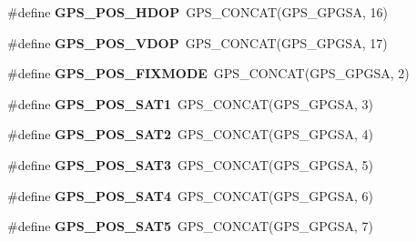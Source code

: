 \begin{DoxyCompactItemize}
\item 
\hypertarget{group___t_m___g_p_s___macros_gae733a3b1c643f873a73a464fab776677}{}\#define {\bfseries G\+P\+S\+\_\+\+P\+O\+S\+\_\+\+H\+D\+O\+P}~G\+P\+S\+\_\+\+C\+O\+N\+C\+A\+T(G\+P\+S\+\_\+\+G\+P\+G\+S\+A, 16)\label{group___t_m___g_p_s___macros_gae733a3b1c643f873a73a464fab776677}

\item 
\hypertarget{group___t_m___g_p_s___macros_gaa400a7eb553cc3e305156431cd422f9b}{}\#define {\bfseries G\+P\+S\+\_\+\+P\+O\+S\+\_\+\+V\+D\+O\+P}~G\+P\+S\+\_\+\+C\+O\+N\+C\+A\+T(G\+P\+S\+\_\+\+G\+P\+G\+S\+A, 17)\label{group___t_m___g_p_s___macros_gaa400a7eb553cc3e305156431cd422f9b}

\item 
\hypertarget{group___t_m___g_p_s___macros_gad8de7d4376d5785c927843ca5ce35f56}{}\#define {\bfseries G\+P\+S\+\_\+\+P\+O\+S\+\_\+\+F\+I\+X\+M\+O\+D\+E}~G\+P\+S\+\_\+\+C\+O\+N\+C\+A\+T(G\+P\+S\+\_\+\+G\+P\+G\+S\+A, 2)\label{group___t_m___g_p_s___macros_gad8de7d4376d5785c927843ca5ce35f56}

\item 
\hypertarget{group___t_m___g_p_s___macros_gaa91cd09303baa12699ddc0b1d13434c2}{}\#define {\bfseries G\+P\+S\+\_\+\+P\+O\+S\+\_\+\+S\+A\+T1}~G\+P\+S\+\_\+\+C\+O\+N\+C\+A\+T(G\+P\+S\+\_\+\+G\+P\+G\+S\+A, 3)\label{group___t_m___g_p_s___macros_gaa91cd09303baa12699ddc0b1d13434c2}

\item 
\hypertarget{group___t_m___g_p_s___macros_gabd1ad9c2a8026780cc0abaa6e6c367c0}{}\#define {\bfseries G\+P\+S\+\_\+\+P\+O\+S\+\_\+\+S\+A\+T2}~G\+P\+S\+\_\+\+C\+O\+N\+C\+A\+T(G\+P\+S\+\_\+\+G\+P\+G\+S\+A, 4)\label{group___t_m___g_p_s___macros_gabd1ad9c2a8026780cc0abaa6e6c367c0}

\item 
\hypertarget{group___t_m___g_p_s___macros_ga0c86e8be497feed2379f993d4f0f4907}{}\#define {\bfseries G\+P\+S\+\_\+\+P\+O\+S\+\_\+\+S\+A\+T3}~G\+P\+S\+\_\+\+C\+O\+N\+C\+A\+T(G\+P\+S\+\_\+\+G\+P\+G\+S\+A, 5)\label{group___t_m___g_p_s___macros_ga0c86e8be497feed2379f993d4f0f4907}

\item 
\hypertarget{group___t_m___g_p_s___macros_ga47a8889aa0fca7daeedd8829f0c7031d}{}\#define {\bfseries G\+P\+S\+\_\+\+P\+O\+S\+\_\+\+S\+A\+T4}~G\+P\+S\+\_\+\+C\+O\+N\+C\+A\+T(G\+P\+S\+\_\+\+G\+P\+G\+S\+A, 6)\label{group___t_m___g_p_s___macros_ga47a8889aa0fca7daeedd8829f0c7031d}

\item 
\hypertarget{group___t_m___g_p_s___macros_ga61923695056e41c2389d8e163e51f530}{}\#define {\bfseries G\+P\+S\+\_\+\+P\+O\+S\+\_\+\+S\+A\+T5}~G\+P\+S\+\_\+\+C\+O\+N\+C\+A\+T(G\+P\+S\+\_\+\+G\+P\+G\+S\+A, 7)\label{group___t_m___g_p_s___macros_ga61923695056e41c2389d8e163e51f530}


\end{DoxyCompactItemize}
